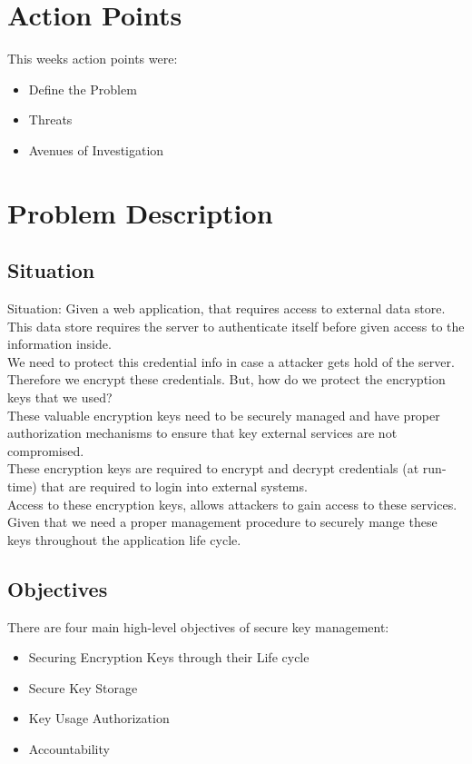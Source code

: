 \documentclass[12pt]{article}
\begin{document}
\maketitle

\section{Action Points}
This weeks action points were:
\begin{itemize}
  \item Define the Problem
  \item Threats
  \item Avenues of Investigation
\end{itemize}


\section{Problem Description}
\subsection{Situation}
Situation: Given a web application, that requires access to external data store.
This data store requires the server to authenticate itself before given access to the information inside. \\

We need to protect this credential info in case a attacker gets hold of the server.
Therefore we encrypt these credentials. But, how do we protect the encryption keys that we used? \\

These valuable encryption keys need to be securely managed and have proper 
authorization mechanisms to ensure that key external services are not compromised. \\

These encryption keys are required to encrypt and decrypt credentials (at run-time) that are required to login into external systems. \\

Access to these encryption keys, allows attackers to gain access to these services. \\

Given that we need a proper management procedure to securely mange these keys throughout the application life cycle. \\

\subsection{Objectives}
There are four main high-level objectives of secure key management:
\begin{itemize}
\item Securing Encryption Keys through their Life cycle
\item Secure Key Storage
\item Key Usage Authorization
\item Accountability
\end{itemize}
\end{document}
